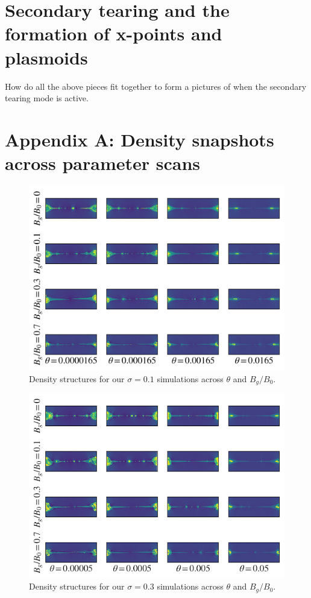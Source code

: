 \documentclass[iop,twocolappendix]{emulateapj}
\begin{document}
\section{Secondary tearing and the formation of x-points and plasmoids}
How do all the above pieces fit together to form a pictures of when the secondary tearing mode is active.



\section{Appendix A: Density snapshots across parameter scans}


\begin{figure}[!h]
	\includegraphics[width=\linewidth]{sig_1_params.png}
	\caption{Density structures for our $\sigma=0.1$ simulations across $\theta$ and $B_{g}/B_{0}$.
	}
	\label{sig.1_matrix}
\end{figure}

\begin{figure}[!h]
	\includegraphics[width=\linewidth]{sig_3_params.png}
	\caption{Density structures for our $\sigma=0.3$ simulations across $\theta$ and $B_{g}/B_{0}$.
	}
	\label{sig.3_matrix}
\end{figure}
\end{document}
